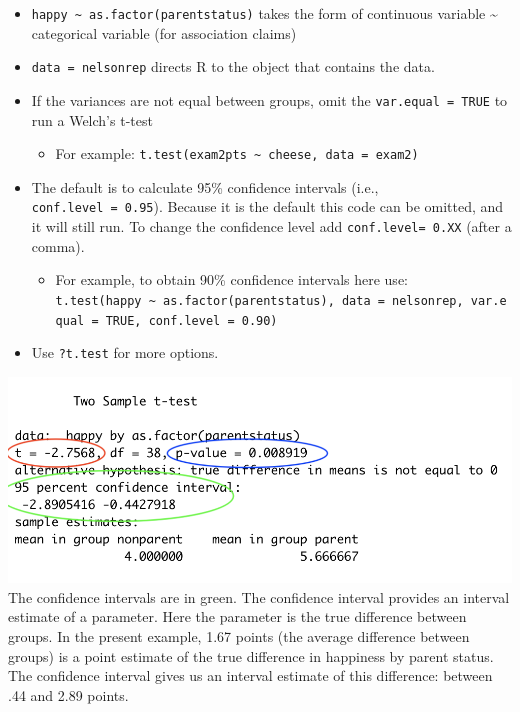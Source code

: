 \documentclass[
]{book}
\providecommand{\tightlist}{%
  \setlength{\itemsep}{0pt}\setlength{\parskip}{0pt}}
\begin{document}
\begin{itemize}
\tightlist
\item
  \texttt{happy\ \textasciitilde{}\ as.factor(parentstatus)} takes the form of continuous variable \textasciitilde{} categorical variable (for association claims)
\item
  \texttt{data\ =\ nelsonrep} directs R to the object that contains the data.
\item
  If the variances are not equal between groups, omit the \texttt{var.equal\ =\ TRUE} to run a Welch's t-test

  \begin{itemize}
  \tightlist
  \item
    For example: \texttt{t.test(exam2pts\ \textasciitilde{}\ cheese,\ data\ =\ exam2)}
  \end{itemize}
\item
  The default is to calculate 95\% confidence intervals (i.e., \texttt{conf.level\ =\ 0.95}). Because it is the default this code can be omitted, and it will still run. To change the confidence level add \texttt{conf.level=\ 0.XX} (after a comma).

  \begin{itemize}
  \tightlist
  \item
    For example, to obtain 90\% confidence intervals here use: \texttt{t.test(happy\ \textasciitilde{}\ as.factor(parentstatus),\ data\ =\ nelsonrep,\ var.equal\ =\ TRUE,\ conf.level\ =\ 0.90)}
  \end{itemize}
\item
  Use \texttt{?t.test} for more options.
\end{itemize}

\includegraphics{img/ttest.png}\\
The confidence intervals are in green. The confidence interval provides an interval estimate of a parameter. Here the parameter is the true difference between groups. In the present example, 1.67 points (the average difference between groups) is a point estimate of the true difference in happiness by parent status. The confidence interval gives us an interval estimate of this difference: between .44 and 2.89 points.
\end{document}
